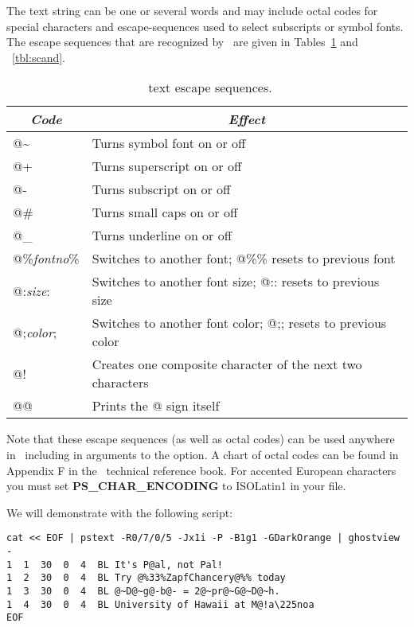 \documentclass[11pt]{report}
\begin{document}

The text string can be one or several words and may include octal codes for
special characters and escape-sequences used to select subscripts or symbol
fonts.  The escape sequences that are recognized by \GMT\ are given in Tables~\ref{tbl:escape}
and ~\ref{tbl:scand}.

\begin{table}[h]
\small
\centering
\begin{tabular}{|l|l|} \hline
\multicolumn{1}{|c|}{\emph{Code}}       &       \multicolumn{1}{c|}{\emph{Effect}} \\ \hline
@\~	&	Turns symbol font on or off \\ \hline 
@+	&	Turns superscript on or off \\ \hline 
@-	&	Turns subscript on or off \\ \hline 
@\#	&	Turns small caps on or off \\ \hline 
@\_	&	Turns underline on or off \\ \hline 
@\%\emph{fontno}\%	&	Switches to another font; @\%\% resets to previous font \\ \hline 
@:\emph{size}:	&	Switches to another font size; @:: resets to previous size \\ \hline 
@;\emph{color};	&	Switches to another font color; @;; resets to previous color \\ \hline 
@!	&	Creates one composite character of the next two characters \\ \hline 
@@	&	Prints the @ sign itself \\ \hline 
\end{tabular}
\caption{\gmt\ text escape sequences.}
\label{tbl:escape}
\end{table}

Note that these escape sequences (as well as octal codes) can be
used anywhere in \GMT\, including in arguments to the  option.
A chart of octal codes can be found in Appendix F in the \GMT\
technical reference book.  For accented European characters you must
set \textbf{PS\_CHAR\_ENCODING} to ISOLatin1 in your  file.

We will demonstrate  with the following script:

{\small\begin{verbatim} 
cat << EOF | pstext -R0/7/0/5 -Jx1i -P -B1g1 -GDarkOrange | ghostview -
1  1  30  0  4  BL It's P@al, not Pal!
1  2  30  0  4  BL Try @%33%ZapfChancery@%% today
1  3  30  0  4  BL @~D@~g@-b@- = 2@~pr@~G@~D@~h.
1  4  30  0  4  BL University of Hawaii at M@!a\225noa
EOF
\end{verbatim}
}
\end{document}
